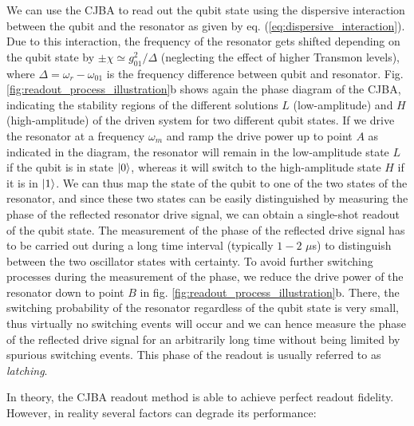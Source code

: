 We can use the CJBA to read out the qubit state using the dispersive interaction between the qubit and the resonator as given by eq. (\ref{eq:dispersive_interaction}). Due to this interaction, the frequency of the resonator gets shifted depending on the qubit state by $\pm\chi\simeq g_{01}^2/\Delta$ (neglecting the effect of higher Transmon levels), where $\Delta=\omega_r-\omega_{01}$ is the frequency difference between qubit and resonator. Fig. \ref{fig:readout_process_illustration}b shows again the phase diagram of the CJBA, indicating the stability regions of the different solutions $L$ (low-amplitude) and $H$ (high-amplitude) of the driven system for two different qubit states. If we drive the resonator at a frequency $\omega_m$ and ramp the drive power up to point $A$ as indicated in the diagram, the resonator will remain in the low-amplitude state $L$ if the qubit is in state $\left| 0 \right>$, whereas it will switch to the high-amplitude state $H$ if it is in $\left| 1 \right>$. We can thus map the state of the qubit to one of the two states of the resonator, and since these two states can be easily distinguished by measuring the phase of the reflected resonator drive signal, we can obtain a single-shot readout of the qubit state. The measurement of the phase of the reflected drive signal has to be carried out during a long time interval (typically $1-2$ $\mu$s) to distinguish between the two oscillator states with certainty. To avoid further switching processes during the measurement of the phase, we reduce the drive power of the resonator down to point $B$ in fig. \ref{fig:readout_process_illustration}b. There, the switching probability of the resonator regardless of the qubit state is very small, thus virtually no switching events will occur and we can hence measure the phase of the reflected drive signal for an arbitrarily long time without being limited by spurious switching events. This phase of the readout is usually referred to as {\it latching}. 

\smallskip

In theory, the CJBA readout method is able to achieve perfect readout fidelity. However, in reality several factors can degrade its performance:

